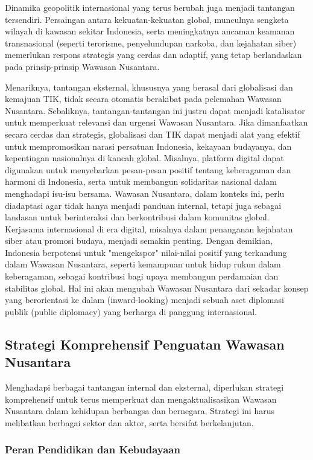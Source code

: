 \documentclass[12pt, a4paper]{article}
\begin{document}
Dinamika geopolitik internasional yang terus berubah juga menjadi tantangan tersendiri. Persaingan antara kekuatan-kekuatan global, munculnya sengketa wilayah di kawasan sekitar Indonesia, serta meningkatnya ancaman keamanan transnasional (seperti terorisme, penyelundupan narkoba, dan kejahatan siber) memerlukan respons strategis yang cerdas dan adaptif, yang tetap berlandaskan pada prinsip-prinsip Wawasan Nusantara.  

Menariknya, tantangan eksternal, khususnya yang berasal dari globalisasi dan kemajuan TIK, tidak secara otomatis berakibat pada pelemahan Wawasan Nusantara. Sebaliknya, tantangan-tantangan ini justru dapat menjadi katalisator untuk memperkuat relevansi dan urgensi Wawasan Nusantara. Jika dimanfaatkan secara cerdas dan strategis, globalisasi dan TIK dapat menjadi alat yang efektif untuk mempromosikan narasi persatuan Indonesia, kekayaan budayanya, dan kepentingan nasionalnya di kancah global. Misalnya, platform digital dapat digunakan untuk menyebarkan pesan-pesan positif tentang keberagaman dan harmoni di Indonesia, serta untuk membangun solidaritas nasional dalam menghadapi isu-isu bersama. Wawasan Nusantara, dalam konteks ini, perlu diadaptasi agar tidak hanya menjadi panduan internal, tetapi juga sebagai landasan untuk berinteraksi dan berkontribusi dalam komunitas global. Kerjasama internasional di era digital, misalnya dalam penanganan kejahatan siber atau promosi budaya, menjadi semakin penting. Dengan demikian, Indonesia berpotensi untuk "mengekspor" nilai-nilai positif yang terkandung dalam Wawasan Nusantara, seperti kemampuan untuk hidup rukun dalam keberagaman, sebagai kontribusi bagi upaya membangun perdamaian dan stabilitas global. Hal ini akan mengubah Wawasan Nusantara dari sekadar konsep yang berorientasi ke dalam (inward-looking) menjadi sebuah aset diplomasi publik (public diplomacy) yang berharga di panggung internasional.  

\subsection*{Strategi Komprehensif Penguatan Wawasan Nusantara}

Menghadapi berbagai tantangan internal dan eksternal, diperlukan strategi komprehensif untuk terus memperkuat dan mengaktualisasikan Wawasan Nusantara dalam kehidupan berbangsa dan bernegara. Strategi ini harus melibatkan berbagai sektor dan aktor, serta bersifat berkelanjutan.
\subsubsection*{Peran Pendidikan dan Kebudayaan}
\end{document}
